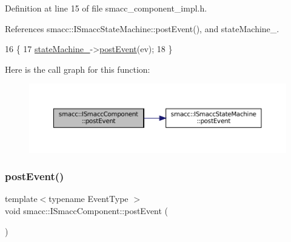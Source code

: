 Definition at line 15 of file smacc\+\_\+component\+\_\+impl.\+h.



References smacc\+::\+I\+Smacc\+State\+Machine\+::post\+Event(), and state\+Machine\+\_\+.


\begin{DoxyCode}
16     \{
17         \hyperlink{classsmacc_1_1ISmaccComponent_ae3f37acc1679f79299b86872d4b1f80f}{stateMachine\_}->\hyperlink{classsmacc_1_1ISmaccStateMachine_afcb6a216441aeaea2cba4e1ab12c366b}{postEvent}(ev);
18     \}
\end{DoxyCode}
Here is the call graph for this function\+:
\nopagebreak
\begin{figure}[H]
\begin{center}
\leavevmode
\includegraphics[width=350pt]{classsmacc_1_1ISmaccComponent_a687dead5b87a3b9781b9bf6ab0b7afa5_cgraph}
\end{center}
\end{figure}
\mbox{\label{classsmacc_1_1ISmaccComponent_a84455564c2c4b90be58e900050232722}} 
\subsubsection{\texorpdfstring{post\+Event()}{postEvent()}\hspace{0.1cm}{\footnotesize\ttfamily [2/2]}}
{\footnotesize\ttfamily template$<$typename Event\+Type $>$ \\
void smacc\+::\+I\+Smacc\+Component\+::post\+Event (\begin{DoxyParamCaption}{ }\end{DoxyParamCaption})\hspace{0.3cm}{\ttfamily [protected]}}

\mbox{\label{classsmacc_1_1ISmaccComponent_a36c085d906fbae0fcaee817aaeafebf4}} 
